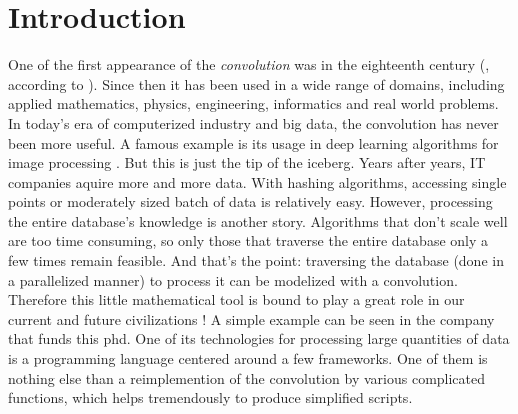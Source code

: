 \chapter*{Introduction}\label{chp:int}

One of the first appearance of the \emph{convolution} was in the eighteenth century (\cite{d1754traite}, according to \cite{dominguezorigin}). Since then it has been used in a wide range of domains, including applied mathematics, physics, engineering, informatics and real world problems. In today's era of computerized industry and big data, the convolution has never been more useful. A famous example is its usage in deep learning algorithms for image processing \citep{lecun2015deep}. But this is just the tip of the iceberg. Years after years, IT companies aquire more and more data. With hashing algorithms, accessing single points or moderately sized batch of data is relatively easy. However, processing the entire database's knowledge is another story. Algorithms that don't scale well are too time consuming, so only those that traverse the entire database only a few times remain feasible. And that's the point: traversing the database (done in a parallelized manner) to process it can be modelized with a convolution. Therefore this little mathematical tool is bound to play a great role in our current and future civilizations ! %
A simple example can be seen in the company that funds this phd. One of its technologies for processing large quantities of data is a programming language centered around a few frameworks. One of them %
is nothing else than a reimplemention of the convolution by various complicated functions, which helps tremendously to produce simplified scripts.


